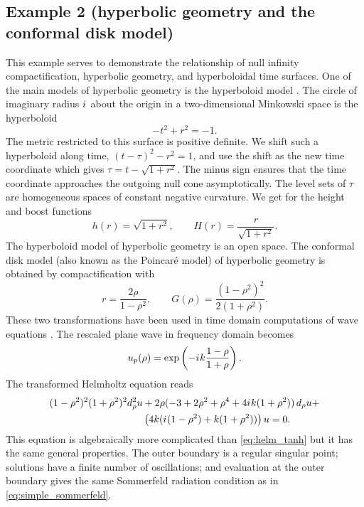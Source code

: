 \documentclass[draft,onefignum,onetabnum]{siamart190516}
\newcommand{\be}{\begin{equation}}
\newcommand{\ee}{\end{equation}}
\newcommand{\iu}{{i\mkern1mu}}
\begin{document}
\subsection{Example 2 (hyperbolic geometry and the conformal disk model)}
This example serves to demonstrate the relationship of null infinity compactification, hyperbolic geometry, and hyperboloidal time surfaces. One of the main models of hyperbolic geometry is the hyperboloid model \cite{thurston1979geometry, loustau2020hyperbolic}.  The circle of imaginary radius $\iu$ about the origin in a two-dimensional Minkowski space is the hyperboloid
\[ -t^2 + r^2 = -1. \]
The metric restricted to this surface is positive definite. We shift such a hyperboloid along time, $(t-\tau)^2 - r^2 = 1$, and use the shift as the new time coordinate which gives $\tau = t - \sqrt{1+r^2}$. The minus sign ensures that the time coordinate approaches the outgoing null cone asymptotically. The level sets of $\tau$ are homogeneous spaces of constant negative curvature. We get for the height and boost functions
\be h(r) = \sqrt{1+r^2}, \qquad H(r) = \frac{r}{\sqrt{1+r^2}}.\ee
The hyperboloid model of hyperbolic geometry is an open space. The conformal disk model (also known as the Poincar\'e model) of hyperbolic geometry is obtained by compactification with
\be\label{eq:ex2_mapping} r =  \frac{2\rho}{1-\rho^2}, \qquad G(\rho) = \frac{(1-\rho^2)^2}{2(1+\rho^2)}. \ee
These two transformations have been used in time domain computations of wave equations \cite{FodorRacz04, fodor2008numerical, Bizo__2009, ZenginogluKidder10}. The rescaled plane wave in frequency domain becomes 
\[ u_p(\rho) = \exp\left(-\iu k \frac{1-\rho}{1+\rho}\right). \]
The transformed Helmholtz equation reads
\begin{align*} 
(1-\rho^2)^2 (1+\rho^2)^2 d_\rho^2 u &+ 2\rho (-3+2\rho^2+\rho^4 + 4\iu k (1+\rho^2) ) \,d_\rho u + \\
& \left( 4 k (\iu(1-\rho^2)+k(1+\rho^2))\right) u=0. 
\end{align*}
This equation is algebraically more complicated than \eqref{eq:helm_tanh} but it has the same general properties. The outer boundary is a regular singular point; solutions have a finite number of oscillations; and evaluation at the outer boundary gives the same Sommerfeld radiation condition as in \eqref{eq:simple_sommerfeld}.

\end{document}
